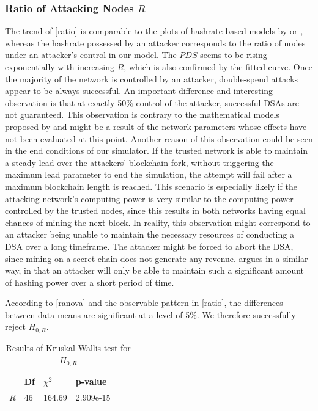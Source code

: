\documentclass[a4paper,12pt,twoside]{report}
\begin{document}
\subsubsection{Ratio of Attacking Nodes $R$}
The trend of \autoref{ratio} is comparable to the plots of hashrate-based models by \cite{HBDSA} or \cite{DSAwithTime}, whereas the hashrate possessed by an attacker corresponds to the ratio of nodes under an attacker's control in our model. The $PDS$ seems to be rising exponentially with increasing $R$, which is also confirmed by the fitted curve. Once the majority of the network is controlled by an attacker, double-spend attacks appear to be always successful. An important difference and interesting observation is that at exactly 50\% control of the attacker, successful DSAs are not guaranteed. This observation is contrary to the mathematical models proposed by \cite{nakamoto2008bitcoin,HBDSA,DSAwithTime} and might be a result of the network parameters whose effects have not been evaluated at this point. Another reason of this observation could be seen in the end conditions of our simulator. If the trusted network is able to maintain a steady lead over the attackers' blockchain fork, without triggering the maximum lead parameter to end the simulation, the attempt will fail after a maximum blockchain length is reached. This scenario is especially likely if the attacking network's computing power is very similar to the computing power controlled by the trusted nodes, since this results in both networks having equal chances of mining the next block. In reality, this observation might correspond to an attacker being unable to maintain the necessary resources of conducting a DSA over a long timeframe. The attacker might be forced to abort the DSA, since mining on a secret chain does not generate any revenue. \cite{longestchain} argues in a similar way, in that an attacker will only be able to maintain such a significant amount of hashing power over a short period of time. 

According to \autoref{ranova} and the observable pattern in \autoref{ratio}, the differences between data means are significant at a level of 5\%. We therefore successfully reject $H_{0,R}$.
\begin{table}[hb]
\centering
\begin{tabular}{|l|l|l|l|l|l|} \hline
& Df & $\chi^{2}$ & p-value \\ \hline
$R$ & 46 & 164.69 & 2.909e-15 \\ \hline
\end{tabular}
\caption{Results of Kruskal-Wallis test for $H_{0,R}$}
\label{ranova}
\end{table}
\end{document}

